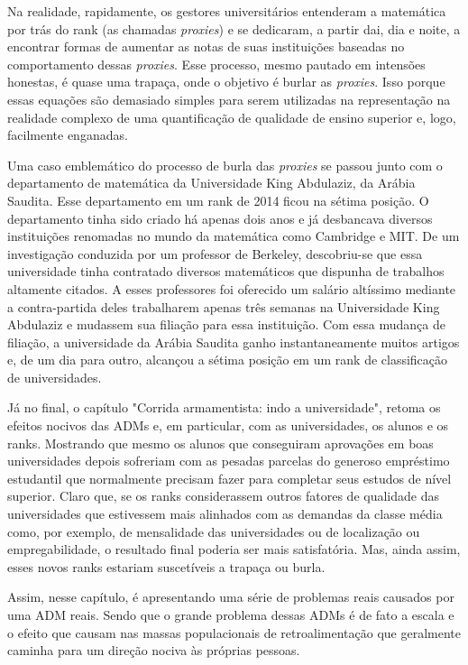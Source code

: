 \documentclass{article}
\begin{document}
Na realidade, rapidamente, os gestores universitários entenderam a matemática por trás do rank (as chamadas \textit{proxies}) e se dedicaram, a partir dai, dia e noite, a encontrar formas de aumentar as notas de suas instituições baseadas no comportamento dessas \textit{proxies}. Esse processo, mesmo pautado em intensões honestas, é quase uma trapaça, onde o objetivo é burlar as \textit{proxies}. Isso porque essas equações são demasiado simples para serem utilizadas na representação na realidade complexo de uma quantificação de qualidade de ensino superior e, logo, facilmente enganadas.

Uma caso emblemático do processo de burla das \textit{proxies} se passou junto com o departamento de matemática da Universidade King Abdulaziz, da Arábia Saudita. Esse departamento em um rank de 2014 ficou na sétima posição. O departamento tinha sido criado há apenas dois anos e já desbancava diversos instituições renomadas no mundo da matemática como Cambridge e MIT. De um investigação conduzida por um professor de Berkeley, descobriu-se que essa universidade tinha contratado diversos matemáticos que dispunha de trabalhos altamente citados. A esses professores foi oferecido um salário altíssimo mediante a contra-partida deles trabalharem apenas três semanas na Universidade King Abdulaziz e mudassem sua filiação para essa instituição. Com essa mudança de filiação, a universidade da Arábia Saudita ganho instantaneamente muitos artigos e, de um dia para outro, alcançou a sétima posição em um rank de classificação de universidades.

Já no final, o capítulo "Corrida armamentista: indo a universidade", retoma os efeitos nocivos das ADMs e, em particular, com as universidades, os alunos e os ranks. Mostrando que mesmo os alunos que conseguiram aprovações em boas universidades depois sofreriam com as pesadas parcelas do generoso empréstimo estudantil que normalmente precisam fazer para completar seus estudos de nível superior. Claro que, se os ranks considerassem outros fatores de qualidade das universidades que estivessem mais alinhados com as demandas da classe média como, por exemplo, de mensalidade das universidades ou de localização ou empregabilidade, o resultado final poderia ser mais satisfatória. Mas, ainda assim, esses novos ranks estariam suscetíveis a trapaça ou burla.

Assim, nesse capítulo, é apresentando uma série de problemas reais causados por uma ADM reais. Sendo que o grande problema dessas ADMs é de fato a escala e o efeito que causam nas massas populacionais de retroalimentação que geralmente caminha para um direção nociva às próprias pessoas.  

\end{document}
